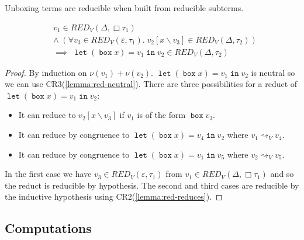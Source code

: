 \documentclass[acmsmall, screen, review, anonymous]{acmart}
\theoremstyle{definition}
\newcommand{\glob}{\mathop{\Box}}
\newcommand{\cempty}{\varepsilon}
\newcommand{\gboxname}{\mathop{\mathtt{box}}}
\newcommand{\gbox}[1]{\gboxname #1}
\newcommand{\gunbox}[3]{\mathop{\mathtt{let}} (\gbox{#1}) = #2 \mathop{\mathtt{in}} #3}
\newcommand{\sub}[2]{[#1\backslash#2]}
\newcommand{\sbst}[3]{#1\sub{#2}{#3}}
\newcommand{\stepstoname}{\rightsquigarrow}
\newcommand{\stepstov}{\stepstoname_V}
\newcommand{\bound}[1]{\nu(#1)}
\newcommand{\redname}{RED}
\newcommand{\redvname}{\redname_{V}}
\newcommand{\redv}[2]{\redvname{({#1},{#2})}}
\begin{document}
Unboxing terms are reducible when built from reducible subterms.
\begin{lemma}
\label{lemma:red-unbox}
\begin{align*}
  &v_1 \in \redv{\Delta}{\glob \tau_1} \\
  &\wedge \; (\forall v_3 \in \redv{\cempty}{\tau_1}.
    \; \sbst{v_2}{x}{v_3} \in \redv{\Delta}{\tau_2}) \\
  &\implies \; \gunbox{x}{v_1}{v_2} \in \redv{\Delta}{\tau_2}
\end{align*}
\end{lemma}
\begin{proof}
  By induction on $\bound{v_1} +
  \bound{v_2}$. $\gunbox{x}{v_1}{v_2}$ is neutral so we can use
  CR3(\ref{lemma:red-neutral}). There are three possibilities for a
  reduct of $\gunbox{x}{v_1}{v_2}$:
  \begin{itemize}
  \item It can reduce to $\sbst{v_2}{x}{v_3}$ if $v_1$ is of the form $\gbox{v_3}$.
  \item It can reduce by congruence to $\gunbox{x}{v_4}{v_2}$ where $v_1 \stepstov v_4$.
  \item It can reduce by congruence to $\gunbox{x}{v_1}{v_5}$ where $v_2 \stepstov v_5$.
  \end{itemize}
  In the first case we have $v_3 \in \redv{\cempty}{\tau_1}$ from
  $v_1 \in \redv{\Delta}{\glob \tau_1}$ and so the reduct is reducible
  by hypothesis. The second and third cases are reducible by the
  inductive hypothesis using CR2(\ref{lemma:red-reduces}).
\end{proof}

\subsection{Computations}
\end{document}
